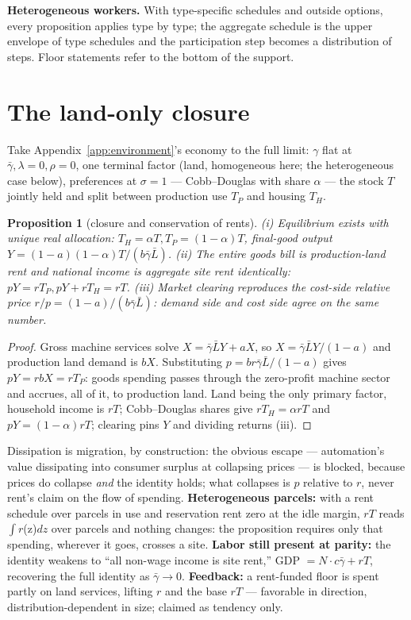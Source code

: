 \documentclass[12pt]{article}
\theoremstyle{plain}
\newtheorem{proposition}{Proposition}
\begin{document}
\textbf{Heterogeneous workers.} With type-specific schedules and outside options, every proposition applies type by type; the aggregate schedule is the upper envelope of type schedules and the participation step becomes a distribution of steps. Floor statements refer to the bottom of the support.

\section{The land-only closure}\label{app:landonly}

Take Appendix~\ref{app:environment}'s economy to the full limit: $\gamma$ flat at $\bar{\gamma}, \lambda = 0, \rho = 0$, one terminal factor (land, homogeneous here; the heterogeneous case below), preferences at $\sigma = 1$ --- Cobb--Douglas with share $\alpha$ --- the stock $T$ jointly held and split between production use $T_P$ and housing $T_H$.

\begin{proposition}[closure and conservation of rents]\label{prop:landonly}
(i) Equilibrium exists with unique real allocation: $T_H = \alpha T, T_P = (1-\alpha )T$, final-good output $Y = (1-a)(1-\alpha )T/(b\bar{\gamma}\bar{L})$. (ii) The entire goods bill is production-land rent and national income is aggregate site rent identically: $pY = rT_P, pY + rT_H = rT$. (iii) Market clearing reproduces the cost-side relative price $r/p = (1-a)/(b\bar{\gamma}\bar{L})$: demand side and cost side agree on the same number.
\end{proposition}

\begin{proof}
Gross machine services solve $X = \bar{\gamma}\bar{L}Y + aX$, so $X = \bar{\gamma}\bar{L}Y/(1-a)$ and production land demand is $bX$. Substituting $p = br\bar{\gamma}\bar{L}/(1-a)$ gives $pY = r bX = rT_P$: goods spending passes through the zero-profit machine sector and accrues, all of it, to production land. Land being the only primary factor, household income is $rT$; Cobb--Douglas shares give $rT_H = \alpha rT$ and $pY = (1-\alpha )rT$; clearing pins $Y$ and dividing returns (iii).
\end{proof}

Dissipation is migration, by construction: the obvious escape --- automation's value dissipating into consumer surplus at collapsing prices --- is blocked, because prices do collapse \emph{and} the identity holds; what collapses is $p$ relative to $r$, never rent's claim on the flow of spending. \textbf{Heterogeneous parcels:} with a rent schedule over parcels in use and reservation rent zero at the idle margin, $rT$ reads $\int r$(z)$dz$ over parcels and nothing changes: the proposition requires only that spending, wherever it goes, crosses a site. \textbf{Labor still present at parity:} the identity weakens to ``all non-wage income is site rent,'' GDP $= N\cdot c\bar{\gamma} + rT$, recovering the full identity as $\bar{\gamma} \to 0$. \textbf{Feedback:} a rent-funded floor is spent partly on land services, lifting $r$ and the base $rT$ --- favorable in direction, distribution-dependent in size; claimed as tendency only.
\end{document}

